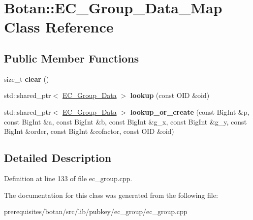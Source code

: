 \hypertarget{class_botan_1_1_e_c___group___data___map}{}\section{Botan\+:\+:E\+C\+\_\+\+Group\+\_\+\+Data\+\_\+\+Map Class Reference}
\label{class_botan_1_1_e_c___group___data___map}
\subsection*{Public Member Functions}
\begin{DoxyCompactItemize}
\item 
\mbox{\label{class_botan_1_1_e_c___group___data___map_a070ab4485ed5081cc276cdcc89599e8e}} 
size\+\_\+t {\bfseries clear} ()
\item 
\mbox{\label{class_botan_1_1_e_c___group___data___map_a0686c33158d3ac37d653a8f71c8e7c66}} 
std\+::shared\+\_\+ptr$<$ \mbox{\hyperlink{class_botan_1_1_e_c___group___data}{E\+C\+\_\+\+Group\+\_\+\+Data}} $>$ {\bfseries lookup} (const O\+ID \&oid)
\item 
\mbox{\label{class_botan_1_1_e_c___group___data___map_a0381af724384099d9c5d5f169b49b470}} 
std\+::shared\+\_\+ptr$<$ \mbox{\hyperlink{class_botan_1_1_e_c___group___data}{E\+C\+\_\+\+Group\+\_\+\+Data}} $>$ {\bfseries lookup\+\_\+or\+\_\+create} (const Big\+Int \&p, const Big\+Int \&a, const Big\+Int \&b, const Big\+Int \&g\+\_\+x, const Big\+Int \&g\+\_\+y, const Big\+Int \&order, const Big\+Int \&cofactor, const O\+ID \&oid)
\end{DoxyCompactItemize}


\subsection{Detailed Description}


Definition at line 133 of file ec\+\_\+group.\+cpp.



The documentation for this class was generated from the following file\+:\begin{DoxyCompactItemize}
\item 
prerequisites/botan/src/lib/pubkey/ec\+\_\+group/ec\+\_\+group.\+cpp\end{DoxyCompactItemize}
